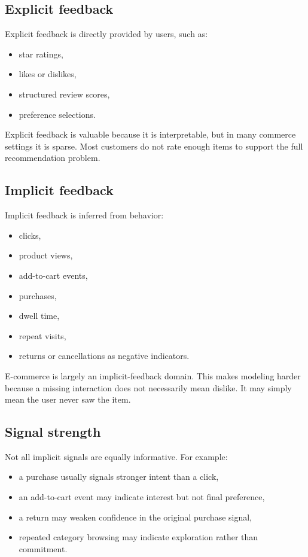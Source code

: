 \subsection{Explicit feedback}
Explicit feedback is directly provided by users, such as:
\begin{itemize}
  \item star ratings,
  \item likes or dislikes,
  \item structured review scores,
  \item preference selections.
\end{itemize}

Explicit feedback is valuable because it is interpretable, but in many commerce settings it is sparse.
Most customers do not rate enough items to support the full recommendation problem.

\subsection{Implicit feedback}
Implicit feedback is inferred from behavior:
\begin{itemize}
  \item clicks,
  \item product views,
  \item add-to-cart events,
  \item purchases,
  \item dwell time,
  \item repeat visits,
  \item returns or cancellations as negative indicators.
\end{itemize}

E-commerce is largely an implicit-feedback domain.
This makes modeling harder because a missing interaction does not necessarily mean dislike.
It may simply mean the user never saw the item.

\subsection{Signal strength}
Not all implicit signals are equally informative.
For example:
\begin{itemize}
  \item a purchase usually signals stronger intent than a click,
  \item an add-to-cart event may indicate interest but not final preference,
  \item a return may weaken confidence in the original purchase signal,
  \item repeated category browsing may indicate exploration rather than commitment.
\end{itemize}


